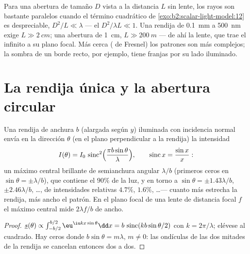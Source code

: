 \begin{remark}\label{rem:b2:diffraction:fresnelnumber}
Para una abertura de tamaño $D$ vista a la distancia $L$ sin lente, los
rayos son bastante paralelos cuando el término cuadrático de
\cref{exo:b2:scalar-light-model:12} es despreciable, $D^2/L \ll \lambda$ ---
el \emph{} $D^2/\lambda L \ll 1$. Una rendija de \qty{0.1}{mm} a
\qty{500}{nm} exige $L \gg \qty{2}{cm}$; una abertura de \qty{1}{cm}, $L \gg \qty{200}{m}$ ---
de ahí la lente, que trae el infinito a su plano focal. Más cerca
( de Fresnel) los patrones son más complejos; la sombra de un
borde recto, por ejemplo, tiene franjas por su lado iluminado.
\end{remark}

\section{La rendija única y la abertura circular}

\begin{proposition}\label{prop:b2:diffraction:slit}
Una rendija de anchura $b$ (alargada según $y$) iluminada con incidencia normal envía en
la dirección $\theta$ (en el plano perpendicular a la rendija) la
intensidad
\[
I(\theta) = I_0\,\operatorname{sinc}^2\Bigl(\frac{\pi b\sin\theta}\lambda\Bigr) , \qquad \operatorname{sinc}x = \frac{\sin x}x :
\]
un máximo central brillante de semianchura angular $\lambda/b$ (primeros ceros en
$\sin\theta = \pm\lambda/b$), que contiene el $90\%$ de la luz, y 
en torno a $\sin\theta = \pm1.43\lambda/b$, $\pm2.46\lambda/b$, \dots, de intensidades
relativas $4.7\%$, $1.6\%$, \dots --- cuanto más estrecha la rendija, más ancho
el patrón. En el plano focal de una lente de distancia focal $f$ el
máximo central mide $2\lambda f/b$ de ancho.
\end{proposition}

\begin{proof}
$\underline s(\theta) \propto \int_{-b/2}^{b/2}\eu^{\iu kx\sin\theta}\dd x = b\,\operatorname{sinc}(kb\sin\theta/2)$
con $k = 2\pi/\lambda$; elévese al cuadrado. Hay ceros donde $b\sin\theta = m\lambda$, $m \ne 0$: las
ondículas de las dos mitades de la rendija se cancelan entonces dos a dos.
\end{proof}

